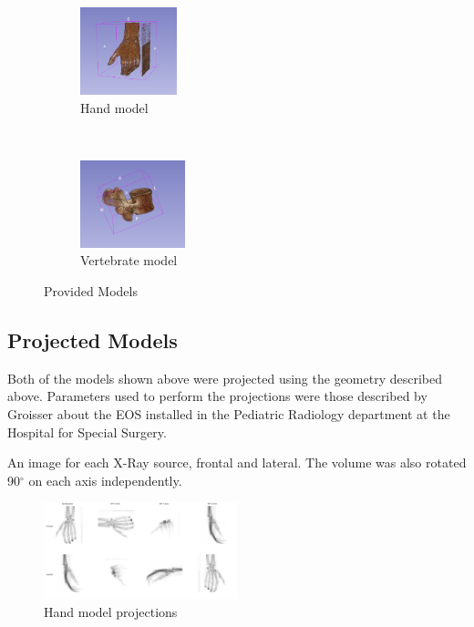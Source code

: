 \documentclass[12pt,twocolumn]{article}
\begin{document}
\begin{figure}[H]
    \centering
    \begin{subfigure}[t]{0.25\textwidth}
        \centering
        \includegraphics[height=1in]{img/hand-3d.png}
        \caption{Hand model}
    \end{subfigure}%
    ~ 
    \begin{subfigure}[t]{0.25\textwidth}
        \centering
        \includegraphics[height=1in]{img/vert-3d.png}
        \caption{Vertebrate model}
    \end{subfigure}
    \caption{Provided Models}
\end{figure}

\subsection{Projected Models}

Both of the models shown above were projected using the geometry described above. Parameters used to perform the
projections were those described by Groisser \cite{groisser2019geometry} about the EOS\textregistered{} installed 
in the Pediatric Radiology department at the Hospital for Special Surgery.

An image for each X-Ray source, frontal and lateral. The volume was also rotated 90$^{\circ}$ 
on each axis independently.

\begin{figure}[H]
  \begin{center}
    \includegraphics[width=0.5\textwidth]{img/hand_composite_labled.png}
  \end{center}
  \caption{Hand model projections}
\end{figure}
\end{document}
